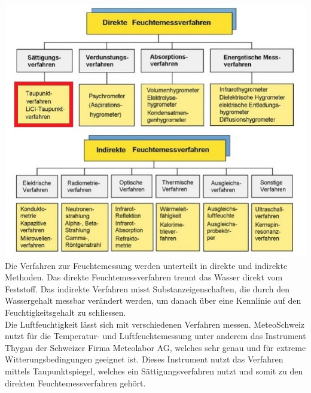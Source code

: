 
\begin{multicols}{2} 

{ \centering
\includegraphics[width=\columnwidth]{graphics/verfahren.jpg}\\
\label{dir_inddir_Messverf}
}
\vfill\columnbreak
Die Verfahren zur Feuchtemessung werden unterteilt in direkte und indirekte Methoden. Das direkte Feuchtemessverfahren trennt das Wasser direkt vom Feststoff. Das indirekte Verfahren misst Substanzeigenschaften, die durch den Wassergehalt messbar verändert werden, um danach über eine Kennlinie auf den Feuchtigkeitsgehalt zu schliessen. \cite{Hesse2014}\cite{Giessereilexikon}\\[0.5cm]
Die Luftfeuchtigkeit lässt sich mit verschiedenen Verfahren messen. MeteoSchweiz nutzt für die Temperatur- und Luftfeuchtemessung unter anderem das Instrument Thygan der Schweizer Firma Meteolabor AG, welches sehr genau und für extreme Witterungsbedingungen geeignet ist. Dieses Instrument nutzt das Verfahren mittels Taupunktspiegel, welches ein Sättigungsverfahren nutzt und somit zu den direkten Feuchtemessverfahren gehört. \cite{MeteoSchweiz2014}\\
\end{multicols}